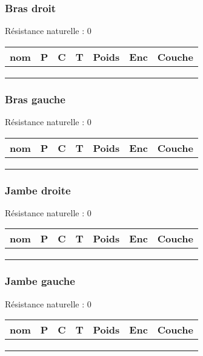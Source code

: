 \documentclass[10pt,a4paper]{article}
\begin{document}
\begin{multicols}{3}
\subsubsection*{Bras droit}
Résistance naturelle : 0
\begin{tabular}{c|c|c|c|c|c|c}
\textbf{nom}&\textbf{P}&\textbf{C}&\textbf{T}&\textbf{Poids}&\textbf{Enc}&\textbf{Couche}\\
\hline
& & & & & \\
\hline
& & & & & \\
\hline
& & & & & \\
\end{tabular}
\subsubsection*{Bras gauche}
Résistance naturelle : 0
\begin{tabular}{c|c|c|c|c|c|c}
\textbf{nom}&\textbf{P}&\textbf{C}&\textbf{T}&\textbf{Poids}&\textbf{Enc}&\textbf{Couche}\\
\hline
& & & & & \\
\hline
& & & & & \\
\hline
& & & & & \\
\end{tabular}
\subsubsection*{Jambe droite}
Résistance naturelle : 0
\begin{tabular}{c|c|c|c|c|c|c}
\textbf{nom}&\textbf{P}&\textbf{C}&\textbf{T}&\textbf{Poids}&\textbf{Enc}&\textbf{Couche}\\
\hline
& & & & & \\
\hline
& & & & & \\
\hline
& & & & & \\
\end{tabular}
\subsubsection*{Jambe gauche}
Résistance naturelle : 0
\begin{tabular}{c|c|c|c|c|c|c}
\textbf{nom}&\textbf{P}&\textbf{C}&\textbf{T}&\textbf{Poids}&\textbf{Enc}&\textbf{Couche}\\
\hline
& & & & & \\
\hline
& & & & & \\
\hline
& & & & & \\
\end{tabular}
\columnbreak

\end{multicols}
\end{document}
